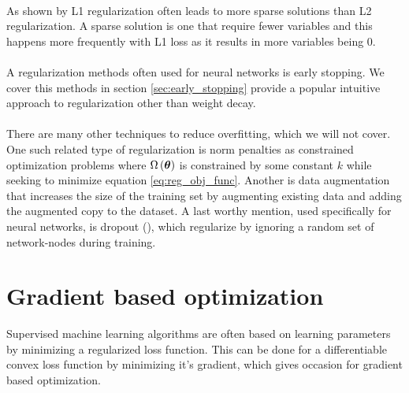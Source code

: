 \\
As shown by \cite{Goodfellow-et-al-2016} L1 regularization often leads to more sparse solutions than L2 regularization. A sparse solution is one that require fewer variables and this happens more frequently with L1 loss as it results in more variables being 0.
\\
\\
A regularization methods often used for neural networks is early stopping. We cover this methods in section \ref{sec:early_stopping} provide a popular intuitive approach to regularization other than weight decay. 
\\
\\
There are many other techniques to reduce overfitting, which we will not cover. One such related type of regularization is norm penalties as constrained optimization problems where $\Omega \left (\boldsymbol{\theta}\right)$ is constrained by some constant $k$ while seeking to minimize equation \ref{eq:reg_obj_func}. Another is data augmentation that increases the size of the training set by augmenting existing data and adding the augmented copy to the dataset. A last worthy mention, used specifically for neural networks, is dropout (\cite{srivastava2014dropout}), which regularize by ignoring a random set of network-nodes during training.

\section{Gradient based optimization} 
Supervised machine learning algorithms are often based on learning parameters by minimizing a regularized loss function. This can be done for a differentiable convex loss function by minimizing it's gradient, which gives occasion for gradient based optimization. 

